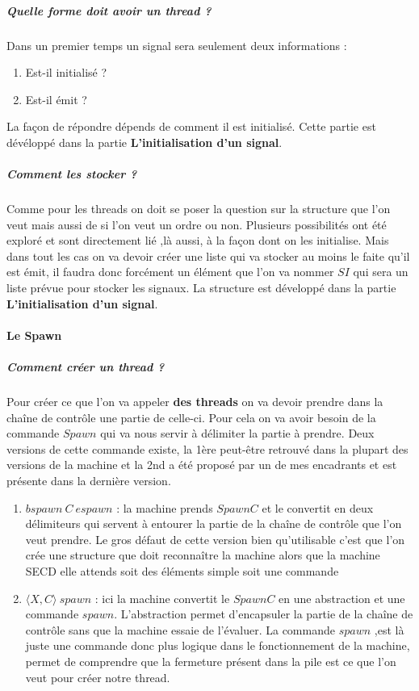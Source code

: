 \documentclass[10pt,a4paper]{article}
\begin{document}
					\subparagraph{Quelle forme doit avoir un thread ?} 
					Dans un premier temps un signal sera seulement deux informations : 
					\begin{enumerate}
						\item Est-il initialisé ?
						\item Est-il émit ?
					\end{enumerate}
					La façon de répondre dépends de comment il est initialisé. Cette partie est dévéloppé dans la partie \textbf{L'initialisation d'un signal}.
						
					\subparagraph{Comment les stocker ?}
					Comme pour les threads on doit se poser la question sur la structure que l'on veut mais aussi de si l'on veut un ordre ou non. Plusieurs possibilités ont été exploré et sont directement lié ,là aussi, à la façon dont on les initialise. Mais dans tout les cas on va devoir créer une liste qui va stocker au moins le faite qu'il est émit, il faudra donc forcément un élément que l'on va nommer $SI$ qui sera un liste prévue pour stocker les signaux. La structure est développé dans la partie \textbf{L'initialisation d'un signal}.
					\bigbreak 
				
						
				\paragraph{Le Spawn} 
					
					\subparagraph{Comment créer un thread ?}
					Pour créer ce que l'on va appeler \textbf{des threads} on va devoir prendre dans la chaîne de contrôle une partie de celle-ci. Pour cela on va avoir besoin de la commande $Spawn$ qui va nous servir à délimiter la partie à prendre. Deux versions de cette commande existe, la 1ère peut-être retrouvé dans la plupart des versions de la machine et la 2nd a été proposé par un de mes encadrants et est présente dans la dernière version.
					\smallbreak
					\begin{enumerate}
						\item $bspawn~C~espawn$ : la machine prends $Spawn C$ et le convertit en deux délimiteurs qui servent à entourer la partie de la chaîne de contrôle que l'on veut prendre. Le gros défaut de cette version bien qu'utilisable c'est que l'on crée une structure que doit reconnaître la machine alors que la machine SECD elle attends soit des éléments simple soit une commande
						\item $\langle X,C\rangle~spawn$ : ici la machine convertit le $Spawn C$ en une abstraction et une commande $spawn$. L'abstraction permet d'encapsuler la partie de la chaîne de contrôle sans que la machine essaie de l'évaluer. La commande $spawn$ ,est là juste une commande donc plus logique dans le fonctionnement de la machine, permet de comprendre que la fermeture présent dans la pile est ce que l'on veut pour créer notre thread. 
					\end{enumerate}
					\medbreak
						
\end{document}
